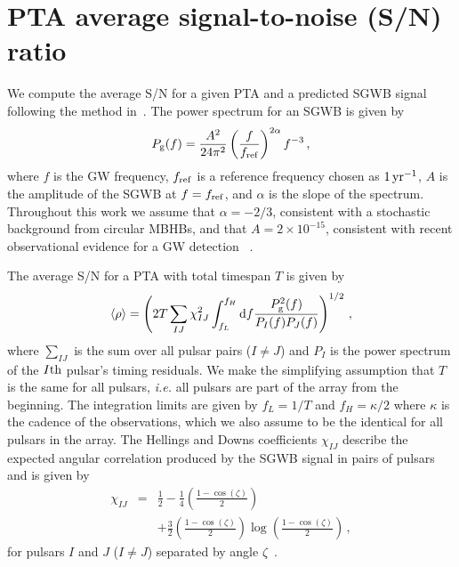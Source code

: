 \documentclass[fleqn,usenatbib]{mnras}
\newcommand{\fref}{f_{\rm ref}}
\newcommand{\Pg}{P_{\rm g}}
\newcommand{\PI}{P_I}
\newcommand{\PJ}{P_J}
\newcommand{\chiIJhd}{\chi_{IJ}}
\begin{document}
\section{PTA average signal-to-noise (S/N) ratio}
\label{sec:snr}

We compute the average S/N for a given PTA and a predicted SGWB signal following the method in~\cite{SiemensEtAl:2013}. 
The power spectrum for an SGWB is given by
\begin{equation}
\Pg (f) = \frac{A^2}{24 \pi^2} \left(\frac{f}{\fref}\right)^{2\alpha} f^{-3}\,,
\label{eqn:Pgw}
\end{equation}
where $f$ is the GW frequency, $\fref$ is a reference frequency chosen as $1\,{\rm yr}^{-1}$, $A$ is the amplitude of the SGWB at $f=\fref$, and $\alpha$ is the slope of the spectrum. 
Throughout this work we assume that $\alpha=-2/3$, consistent with a stochastic background from circular MBHBs, and that $A = 2 \times 10^{-15}$, consistent with recent observational evidence for a GW detection ~\citep{MPTAGWMilesEtAl:2025, PPTAGWReardonEtAl:2023, ETPAInPTAGWBAntoniadisEtAl:2023, NANOGravGWBAgazieEtAl:2023, CPTAGWBXuEtAl:2023, IPTADR2:2022,GoncharovEtAlPPTA:2021, ChenEtAlEPTA:2021, NANOGrav12.5GWB:2020}.

The average S/N for a PTA with total timespan $T$ is given by~\citep{SiemensEtAl:2013}
\begin{equation}
\left< \rho \right> = \left( 2 T \sum_{IJ} \chiIJhd^2 
                             \int_{f_L}^{f_H} {\rm d}f  
                             \frac{\Pg^2 (f)}{\PI(f)\PJ(f)}
                            \right)^{1/2}\,,
\label{eqn:snrPIPJPg}
\end{equation}
where $\sum_{IJ}$ is the sum over all pulsar pairs ($I \neq J$) and $P_I$ is the power spectrum of the $I{\rm th}$ pulsar's timing residuals. 
We make the simplifying assumption that $T$ is the same for all pulsars, \emph{i.e.} all pulsars are part of the array from the beginning. 
The integration limits are given by $f_L=1/T$ and $f_H=\kappa/2$ where $\kappa$ is the cadence of the observations, which we also assume to be the identical for all pulsars in the array. 
The Hellings and Downs coefficients $\chi_{IJ}$ describe the expected angular correlation produced by the SGWB signal in pairs of pulsars and is given by
\begin{eqnarray}
\chiIJhd &=& \frac{1}{2} 
           - \frac{1}{4} \left(\frac{1 - \cos(\zeta)}{2}\right) \nonumber\\
           && + \frac{3}{2} \left(\frac{1 - \cos(\zeta)}{2}\right) 
           \log \left( \frac{1 - \cos(\zeta)}{2} \right)\,,
\label{eqn:hd}
\end{eqnarray}
for pulsars $I$ and $J$ ($I \neq J$) separated by angle $\zeta$~\citep{HellingsDowns:1983}.
\end{document}
